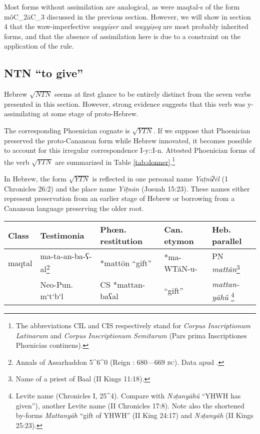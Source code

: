 \documentclass[oldfontcommands,oneside,a4paper,11pt]{article}
\newcommand{\racine}[1]{\begin{math}\sqrt{#1}\end{math}}
\newcommand{\forme}[1]{\textit{#1}}
\begin{document}
\begin{sloppypar}
Most forms without assimilation are  analogical, as were maqtal-s of the form {môC_2āC_3} discussed in the previous section. However, we will show   in section 4 that the waw-imperfective \forme{wayyīṣer} and  \forme{wayyīṣeq} are most probably inherited forms, and that the absence of assimilation here is due to a constraint on the application of the rule.

\subsection{NTN ``to give''} \label{ntn}
Hebrew \racine{NTN} seems at first glance to be entirely distinct from the seven verbs presented in this section. However, strong evidence suggests that this verb was y-assimilating at some stage of proto-Hebrew. 

The corresponding Phoenician cognate is \racine{YTN}. If we suppose that Phoenician preserved the proto-Cananean form while Hebrew innovated, it becomes possible to account for this irregular correspondence I-y::I-n. Attested Phoenician forms of the verb \racine{YTN} are summarized in Table \ref{tab:donner}.\footnote{The abbreviations CIL and CIS respectively stand for \textit{Corpus Inscriptionum Latinarum} and \textit{Corpus Inscriptionum Semitarum} (Pars prima Inscriptiones Phœnicias continens). }

In Hebrew, the form \racine{YTN} is reflected in one personal name \forme{Yaṯnīʔēl} (1 Chronicles 26:2) and the place name \forme{Yiṯnān} (Josuah 15:23). These names either represent preservation from an earlier stage of Hebrew or borrowing from a Cananean language preserving the older root.


\begin{table}

  \smallskip
  \begin{minipage}{12 cm}
  	\scriptsize
\begin{tabular}{lllll} \toprule
Class&	Testimonia&	Phœn. restitution&	Can. etymon&	Heb. parallel\\
\midrule
maqtal&	ma-ta-an-ba-ʕ-al\footnote{Annals of Assarhaddon 5^6^0 (Reign : 680—669 \textsc{bc}). Data apud \citet[89]{friedrich51punisch}.} &	*mattōn ``gift''&	*ma-WTáN-u-&	PN \forme{mattān}\footnote{Name of a priest of Baal (II Kings 11:18).}\\
&	Neo-Pun. m‘t‘b‘l  &	CS *mattan-baʕal&	``gift''&	 \forme{mattan-yāhû} \footnote{ Levite name (Chronicles I, 25^4). Compare with \forme{Nǝṯanyāhû} ``YHWH has given''), another Levite name (II Chronicles 17:8). Note also the shortened by-forms \forme{Mattanyāh} ``gift of YHWH'' (II King 24:17) and \forme{Nǝṯanyāh} (II Kings  25:23).} \\



\end{tabular}
\end{minipage}
\end{table}
\end{sloppypar}
\end{document}
